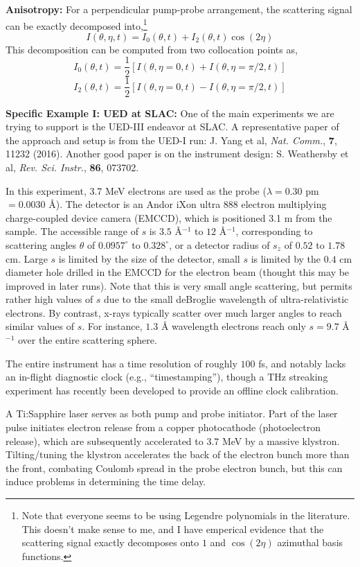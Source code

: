 \documentclass[fleqn,oneside,12pt]{article}
\begin{document}
\textbf{Anisotropy:} For a perpendicular pump-probe arrangement, the scattering
signal can be exactly decomposed into,\footnote{Note that everyone seems to be
using Legendre polynomials in the literature. This doesn't make sense to me, and
I have emperical evidence that the scattering signal exactly decomposes onto $1$
and $\cos (2 \eta)$ azimuthal basis functions.}
\[
I (\theta, \eta, t)
=
I_{0} (\theta, t)
+
I_{2} (\theta, t) \cos (2 \eta)
\]
This decomposition can be computed from two collocation points as,
\[
I_{0} (\theta, t)
=
\frac{1}{2}
\left [
I (\theta, \eta=0, t)
+
I (\theta, \eta=\pi/2, t)
\right ]
\]
\[
I_{2} (\theta, t)
=
\frac{1}{2}
\left [
I (\theta, \eta=0, t)
-
I (\theta, \eta=\pi/2, t)
\right ]
\]

\textbf{Specific Example I: UED at SLAC:} One of the main experiments we are
trying to support is the UED-III endeavor at SLAC. A representative paper of the
approach and setup is from the UED-I run: J. Yang et al, \emph{Nat. Comm.},
\textbf{7}, 11232 (2016). Another good paper is on the instrument design: S.
Weathersby et al, \emph{Rev. Sci. Instr.}, \textbf{86}, 073702. 

In this experiment, 3.7 MeV electrons are used as the probe ($\lambda = 0.30$ pm
$= 0.0030$ \AA{}). The detector is an Andor iXon ultra 888 electron multiplying
charge-coupled device camera (EMCCD), which is positioned 3.1 m from the sample.
The accessible range of $s$ is $3.5$ \AA{}$^{-1}$ to $12$ \AA{}$^{-1}$,
corresponding to scattering angles $\theta$ of $0.0957^{\circ}$ to
$0.328^{\circ}$, or a detector radius of $s_{z}$ of $0.52$ to $1.78$ cm. Large
$s$ is limited by the size of the detector, small $s$ is limited by the $0.4$ cm
diameter hole drilled in the EMCCD for the electron beam (thought this may be
improved in later runs). Note that this is very small angle scattering, but
permits rather high values of $s$ due to the small deBroglie wavelength of
ultra-relativistic electrons. By contrast, x-rays typically scatter over much
larger angles to reach similar values of $s$. For instance, $1.3$ \AA{}
wavelength electrons reach only $s = 9.7$ \AA{}$^{-1}$ over the entire
scattering sphere.

The entire instrument has a time resolution of roughly $100$ fs, and notably
lacks an in-flight diagnostic clock (e.g., ``timestamping''), though a THz
streaking experiment has recently been developed to provide an offline clock
calibration. 

A Ti:Sapphire laser serves as both pump and probe initiator. Part of the laser
pulse initiates electron release from a copper photocathode (photoelectron
release), which are subsequently accelerated to 3.7 MeV by a massive klystron.
Tilting/tuning the klystron accelerates the back of the electron bunch more than
the front, combating Coulomb spread in the probe electron bunch, but this can
induce problems in determining the time delay. 
\end{document}
